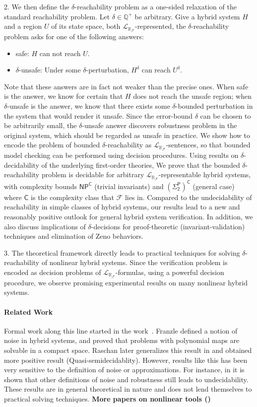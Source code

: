 \documentclass[envcountsect]{llncs}
\newcommand{\lrf}{\mathcal{L}_{\mathbb{R}_{\mathcal{F}}}}
\begin{document}
2. We then define the $\delta$-reachability problem as a one-sided
relaxation of the standard reachability problem. Let $\delta\in \mathbb{Q}^+$ be
arbitrary. Give a hybrid system $H$ and a region $U$ of its state
space, both $\lrf$-represented, the $\delta$-reachability problem asks for
one of the following answers:
\begin{itemize}
 \item {\sf safe}: $H$ can not reach $U$.
 \item {\sf $\delta$-unsafe}: Under some $\delta$-perturbation, $H^{\delta}$ can
reach $U^{\delta}$. 
\end{itemize}
Note that these answers are in fact not weaker than the precise ones. When {\sf
safe} is the answer, we know for certain that $H$ does not reach the unsafe
region; when {\sf $\delta$-unsafe} is the answer, we know that there exists some
$\delta$-bounded perturbation in the system that would render it unsafe. Since
the error-bound $\delta$ can be chosen to be arbitrarily small, the
$\delta$-unsafe answer discovers robustness problem in the original system,
which should be regarded as unsafe in practice. We show how to encode the
problem of bounded $\delta$-reachability as $\lrf$-sentences, so that bounded
model checking can be performed using decision procedures. Using results on
$\delta$-decidability of the underlying first-order theories, We prove that the
bounded $\delta$-reachability problem is decidable for arbitrary
$\lrf$-representable hybrid systems, with complexity bounds
$\mathsf{NP^C}$ (trivial invariants) and $\mathsf{(\Sigma_2^P)^C}$ (general
case) where $\mathsf{C}$ is the complexity class that $\mathcal{F}$ lies in.
Compared to the undecidability of reachability in simple classes of hybrid
systems, our results lead to a new and reasonably positive outlook for
general hybrid system verification. In addition, we also discuss implications
of $\delta$-decisions for proof-theoretic (invariant-validation) techniques and
elimination of Zeno behaviors. 

3. The theoretical framework directly leads to practical techniques for solving
$\delta$-reachability of nonlinear hybrid systems. Since the verification
problem is encoded as decision problems of $\lrf$-formulas, using a
powerful decision procedure, we observe promising experimental results on many
nonlinear hybrid systems. 

\paragraph{Related Work}
Formal work along this line started in the work~\cite{}.
Franzle defined a notion of noise in hybrid systems, and proved that problems
with polynomial maps are solvable in a compact space. Raschan later generalizes
this result in \cite{} and obtained more positive result
(Quasi-semidecidablity). However, results like this has been very sensitive to
the definition of noise or approximations. For instance, in \cite{} it is shown
that other definitions of noise and robustness still leads to undecidability.
These results are in general theoretical in nature and does not lend themselves
to practical solving techniques. {\bf More papers on nonlinear tools ()}
\end{document}
